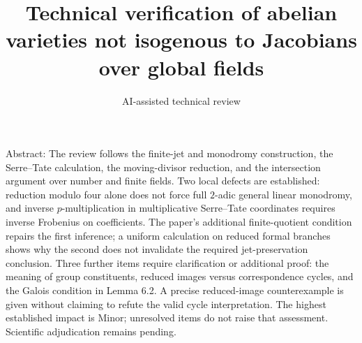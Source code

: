 \documentclass[10pt]{article}
\title{Technical verification of abelian varieties
not isogenous to Jacobians over global fields}
\author{AI-assisted technical review}
\date{}
\begin{document}
\maketitle
Abstract: The review follows the finite-jet and monodromy construction, the Serre–Tate calculation, the moving-divisor reduction, and the intersection argument over number and finite fields. Two local defects are established: reduction modulo four alone does not force full \(2\)-adic general linear monodromy, and inverse \(p\)-multiplication in multiplicative Serre–Tate coordinates requires inverse Frobenius on coefficients. The paper’s additional finite-quotient condition repairs the first inference; a uniform calculation on reduced formal branches shows why the second does not invalidate the required jet-preservation conclusion. Three further items require clarification or additional proof: the meaning of group constituents, reduced images versus correspondence cycles, and the Galois condition in Lemma 6.2. A precise reduced-image counterexample is given without claiming to refute the valid cycle interpretation. The highest established impact is Minor; unresolved items do not raise that assessment. Scientific adjudication remains pending.\par
\end{document}
